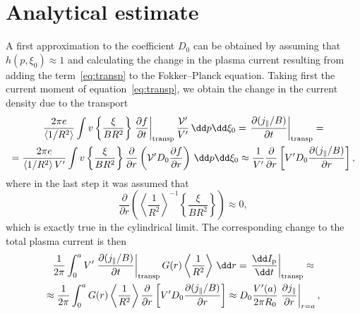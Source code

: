 \documentclass{notes}
\newcommand{\Vp}{\mathcal{V}'}
\begin{document}
	\section{Analytical estimate}
	A first approximation to the coefficient $D_0$ can be obtained by assuming
	that $h(p,\xi_0)\approx 1$ and calculating the change in the plasma current
	resulting from adding the term~\eqref{eq:transp} to the Fokker--Planck
	equation. Taking first the current moment of equation~\eqref{eq:transp},
	we obtain the change in the current density due to the transport
	\begin{equation}
		\begin{gathered}
			\frac{2\pi e}{\left\langle1/R^2\right\rangle}
			\int
				v\left\{\frac{\xi}{BR^2}\right\}
				\left.\frac{\partial f}{\partial t}\right|_{\rm transp}
				\frac{\Vp}{V'}\,\dd p\dd\xi_0 =
			\left.\frac{\partial (j_\parallel/B)}{\partial t}\right|_{\rm transp} =\\
			=
			\frac{2\pi e}{\left\langle 1/R^2 \right\rangle V'}
			\int
				v\left\{\frac{\xi}{BR^2}\right\}
				\frac{\partial}{\partial r}\left(
					\Vp D_0 \frac{\partial f}{\partial r}
				\right)\,
				\dd p\dd\xi_0
			\approx
				\frac{1}{V'}\frac{\partial}{\partial r}\left[
					V' D_0 \frac{\partial(j_\parallel/B)}{\partial r}
				\right],
		\end{gathered}
	\end{equation}
	where in the last step it was assumed that
	\begin{equation}
		\frac{\partial}{\partial r}\left(
			\left\langle \frac{1}{R^2}\right\rangle^{-1}
			\left\{\frac{\xi}{BR^2}\right\}
		\right)\approx 0,
	\end{equation}
	which is exactly true in the cylindrical limit. The corresponding change
	to the total plasma current is then
	\begin{equation}
		\begin{gathered}
			\frac{1}{2\pi}\int_0^a V'
				\left.\frac{\partial(j_\parallel/B)}{\partial t}\right|_{\rm transp}
				G(r)\left\langle\frac{1}{R^2}\right\rangle\,\dd r
				=
				\left.\frac{\dd I_{\rm p}}{\dd t}\right|_{\rm transp}
				\approx\\
				\approx
				\frac{1}{2\pi}\int_0^a
					G(r)\left\langle\frac{1}{R^2}\right\rangle
					\frac{\partial}{\partial r}\left[
						V' D_0\frac{\partial(j_\parallel/B)}{\partial r}
					\right]
				\approx
				D_0
				\frac{V'(a)}{2\pi R_0}
				\left.\frac{\partial j_\parallel}{\partial r}\right|_{r=a},
		\end{gathered}
	\end{equation}
\end{document}
